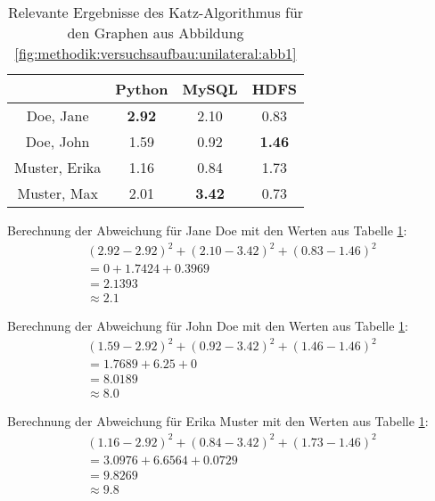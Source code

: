 \begin{table}[h]
	\centering
	\begin{tabular}{c|c|c|c}
		& Python & MySQL & HDFS\\ 
		\hline
		Doe, Jane     & \cellcolor{usercolor}\textbf{2.92} & \cellcolor{itemcolor}2.10 & \cellcolor{exxetagray}0.83\\
		Doe, John     & \cellcolor{exxetagray}1.59 & \cellcolor{itemcolor}0.92 & \cellcolor{itemcolor}\textbf{1.46}\\
		Muster, Erika & \cellcolor{exxetagray}1.16 & \cellcolor{exxetagray}0.84 & \cellcolor{usercolor}1.73\\
		Muster, Max   & \cellcolor{itemcolor}2.01 & \cellcolor{itemcolor}\textbf{3.42} & \cellcolor{exxetagray}0.73
	\end{tabular}
	\caption{Relevante Ergebnisse des Katz-Algorithmus für den Graphen aus Abbildung \ref{fig:methodik:versuchsaufbau:unilateral:abb1}}
	\label{tbl:nebenrechnungen:bilateral:tbl2}
\end{table}

Berechnung der Abweichung für Jane Doe mit den Werten aus Tabelle \ref{tbl:nebenrechnungen:bilateral:tbl2}:
\begin{gather}
	\nonumber (2.92-2.92)^2 + (2.10-3.42)^2 + (0.83-1.46)^2\\
	\nonumber = 0 + 1.7424 + 0.3969\\
	\nonumber = 2.1393\\
	\approx 2.1
	\label{frml:nebenrechnungen:bilateral:jane}
\end{gather}

Berechnung der Abweichung für John Doe mit den Werten aus Tabelle \ref{tbl:nebenrechnungen:bilateral:tbl2}:
\begin{gather}
	\nonumber (1.59-2.92)^2 + (0.92-3.42)^2 + (1.46-1.46)^2\\
	\nonumber = 1.7689 + 6.25 + 0\\
	\nonumber = 8.0189\\
	\approx 8.0
	\label{frml:nebenrechnungen:bilateral:john}
\end{gather}

Berechnung der Abweichung für Erika Muster mit den Werten aus Tabelle \ref{tbl:nebenrechnungen:bilateral:tbl2}:
\begin{gather}
	\nonumber (1.16-2.92)^2 + (0.84-3.42)^2 + (1.73-1.46)^2\\
	\nonumber = 3.0976 + 6.6564 + 0.0729\\
	\nonumber = 9.8269\\
	\approx 9.8
	\label{frml:nebenrechnungen:bilateral:erika}
\end{gather}

